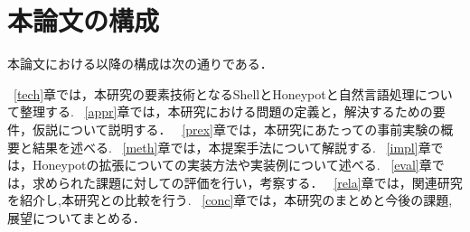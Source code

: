\section{本論文の構成}
\label{intr:kosei}
本論文における以降の構成は次の通りである．

~\ref{tech}章では，本研究の要素技術となるShellとHoneypotと自然言語処理について整理する.
~\ref{appr}章では，本研究における問題の定義と，解決するための要件，仮説について説明する．
~\ref{prex}章では，本研究にあたっての事前実験の概要と結果を述べる.
~\ref{meth}章では，本提案手法について解説する.
~\ref{impl}章では，Honeypotの拡張についての実装方法や実装例について述べる.
~\ref{eval}章では，求められた課題に対しての評価を行い，考察する．
~\ref{rela}章では，関連研究を紹介し,本研究との比較を行う.
~\ref{conc}章では，本研究のまとめと今後の課題,展望についてまとめる．


